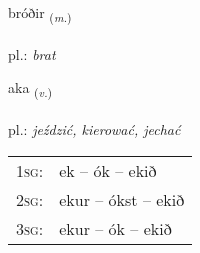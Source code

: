 \documentclass[frontgrid, backgrid]{flacards}\usepackage[]{graphicx}\usepackage[]{xcolor}
\begin{document}
\renewcommand{\blhead}{\vskip5pt {\small\bfseries\footnotesize Nafnorð | Noun }}
\renewcommand{\bcfoot}{\vskip5pt \hspace{2pt}{\small\bfseries\footnotesize 1K}}


{bróðir \small{\textsubscript{(\textit{m.})}} \\[1ex] %
\textphonetic{[prouːðɪr]} \\
pl.: \emph{brat} \\  [2ex]
\renewcommand*{\arraystretch}{0.8}
}

\renewcommand{\flhead}{\vskip5pt \fboxsep=0pt {\small\bfseries\footnotesize Sagnorð | Verb}}
\renewcommand{\fcfoot}{\vskip5pt \fboxsep=0pt \hspace{2pt}{\small\bfseries\footnotesize 1K}}

\renewcommand{\blhead}{\vskip5pt {\small\bfseries\footnotesize Sagnorð | Verb }}
\renewcommand{\bcfoot}{\vskip5pt \hspace{2pt}{\small\bfseries\footnotesize 1K}}


{aka \small{\textsubscript{(\textit{v.})}} \\[1ex] %
\textphonetic{[aːka]} \\
pl.: \emph{jeździć, kierować, jechać} \\  [2ex]
\renewcommand*{\arraystretch}{0.8}
\begin{tabular}{p{1cm}l}
\textsc{1sg}: & ek -- ók -- ekið \\ 
\textsc{2sg}: & ekur -- ókst -- ekið \\ 
\textsc{3sg}: & ekur -- ók -- ekið \\ 
\end{tabular}
}

\renewcommand{\flhead}{\vskip5pt \fboxsep=0pt {\small\bfseries\footnotesize Sagnorð | Verb}}
\renewcommand{\fcfoot}{\vskip5pt \fboxsep=0pt \hspace{2pt}{\small\bfseries\footnotesize 1K}}
\end{document}
